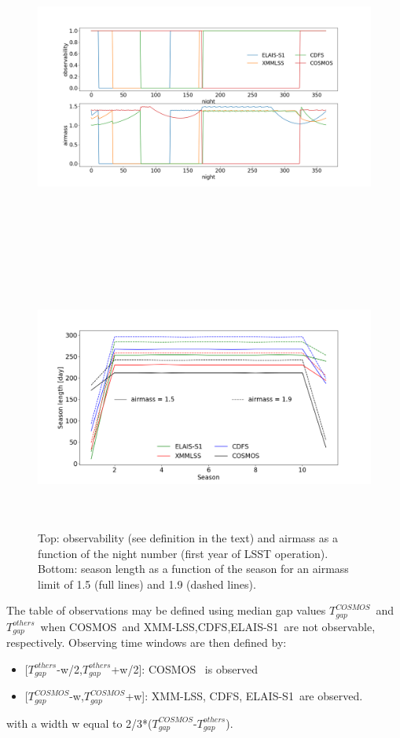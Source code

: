 \documentclass [11pt,a4paper]{article}
\newcommand{\cosmos}{COSMOS}
\newcommand{\xmmlss}{XMM-LSS}
\newcommand{\cdfs}{CDFS}
\newcommand{\elais}{ELAIS-S1}
\newcommand{\tgapcosmos}{$T_{gap}^{\cosmos}$}
\newcommand{\tgapothers}{$T_{gap}^{others}$}
\begin{document}
\begin{figure}[!htbp]
\begin{center}
  
  \includegraphics[width=18cm,height=12cm]{Figures/observability.png}
  \includegraphics[width=18cm,height=8cm]{Figures/Season_length.png}
 \caption{Top: observability (see definition in the text) and airmass as a function of the night number (first year of LSST operation). Bottom: season length as a function of the season for an airmass limit of 1.5 (full lines) and 1.9 (dashed lines).}\label{fig:observability}
\end{center}
\end{figure}

The table of observations may be defined using median gap values \tgapcosmos~and \tgapothers~when \cosmos~and \xmmlss,\cdfs,\elais~are not observable, respectively. Observing time windows are then defined by:
\begin{itemize}
\item{[\tgapothers-w/2,\tgapothers+w/2]: \cosmos~ is observed}
\item{[\tgapcosmos-w,\tgapcosmos+w]: \xmmlss, \cdfs, \elais~are observed.}
\end{itemize}
with a width w equal to 2/3*(\tgapcosmos-\tgapothers).
\end{document}
